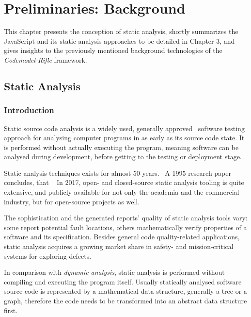 \chapter{Preliminaries: Background}

This chapter presents the conception of static analysis, shortly summarizes the JavaScript and its static analysis approaches to be detailed in Chapter 3, and gives insights to the previously mentioned background technologies of the \emph{Codemodel-Rifle} framework.


\section{Static Analysis}


\subsection{Introduction}

Static source code analysis is a widely used, generally approved~\cite{373902} software testing approach for analysing computer programs in as early as its source code state. It is performed without actually executing the program, meaning software can be analysed during development, before getting to the testing or deployment stage.

Static analysis techniques exists for almost 50 years.~\cite{emanuelsson2008comparative} A 1995 research paper concludes, that ~\cite{373902} In 2017, open- and closed-source static analysis tooling is quite extensive, and publicly available for not only the academia and the commercial industry, but for open-source projects as well.~\cite{wikipedia-static-analysis}

The sophistication and the generated reports' quality of static analysis tools vary: some report potential fault locations, others mathematically verify properties of a software and its specification. Besides general code quality-related applications, static analysis acquires a growing market share in safety- and mission-critical systems for exploring defects.~\cite{livshits2006improving}

In comparison with \emph{dynamic analysis}, static analysis is performed without compiling and executing the program itself. Usually statically analysed software source code is represented by a mathematical data structure, generally a tree or a graph, therefore the code needs to be transformed into an abstract data structure first.



